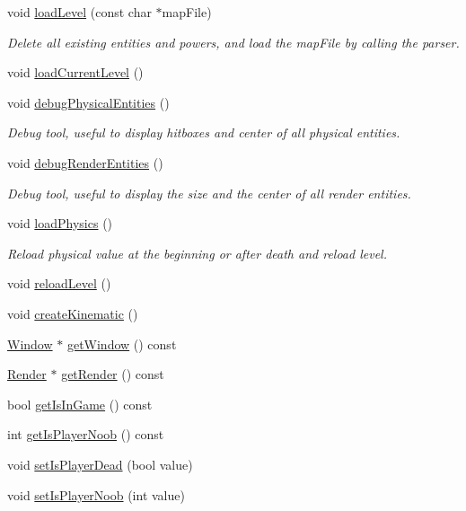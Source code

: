 \begin{DoxyCompactItemize}
void \hyperlink{class_symp_1_1_game_manager_a330de72544980faa5889c81c7d05bec5}{load\-Level} (const char $\ast$map\-File)
\begin{DoxyCompactList}\small\item\em Delete all existing entities and powers, and load the map\-File by calling the parser. \end{DoxyCompactList}\item 
void \hyperlink{class_symp_1_1_game_manager_a1c0d73555fbec1f38e6be3f1f838f8ac}{load\-Current\-Level} ()
\item 
void \hyperlink{class_symp_1_1_game_manager_a4916acefa261d4db81bc1dd26cb2b403}{debug\-Physical\-Entities} ()
\begin{DoxyCompactList}\small\item\em Debug tool, useful to display hitboxes and center of all physical entities. \end{DoxyCompactList}\item 
void \hyperlink{class_symp_1_1_game_manager_a448082eae851a482e66df7b989f0eea9}{debug\-Render\-Entities} ()
\begin{DoxyCompactList}\small\item\em Debug tool, useful to display the size and the center of all render entities. \end{DoxyCompactList}\item 
void \hyperlink{class_symp_1_1_game_manager_a3498f818c58050eae82f06cd4e281874}{load\-Physics} ()
\begin{DoxyCompactList}\small\item\em Reload physical value at the beginning or after death and reload level. \end{DoxyCompactList}\item 
void \hyperlink{class_symp_1_1_game_manager_a37bd929c492f811d45affc348b5a96dd}{reload\-Level} ()
\item 
void \hyperlink{class_symp_1_1_game_manager_ae50df7b7d6bbc9b3ae4b5881e5a38724}{create\-Kinematic} ()
\item 
\hyperlink{class_symp_1_1_window}{Window} $\ast$ \hyperlink{class_symp_1_1_game_manager_aa415fa93a61f52538c55513ab84b2148}{get\-Window} () const 
\item 
\hyperlink{class_symp_1_1_render}{Render} $\ast$ \hyperlink{class_symp_1_1_game_manager_a95eba8af1a70bd697b2d14aa50bd5554}{get\-Render} () const 
\item 
bool \hyperlink{class_symp_1_1_game_manager_a251b46e6c4c221119e54f66c93e70ce0}{get\-Is\-In\-Game} () const 
\item 
int \hyperlink{class_symp_1_1_game_manager_ac1255f7ce1f67eb67a39197b86d17d23}{get\-Is\-Player\-Noob} () const 
\item 
void \hyperlink{class_symp_1_1_game_manager_a8deb8d3ed654d6651ec3b7ab57c8a1bd}{set\-Is\-Player\-Dead} (bool value)
\item 
void \hyperlink{class_symp_1_1_game_manager_a29a45f9f3c6a75f0801b7804f6c6876a}{set\-Is\-Player\-Noob} (int value)
\end{DoxyCompactItemize}
